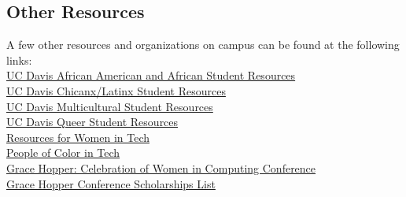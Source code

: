 \documentclass{article}
\begin{document}
\subsection {Other Resources} 
A few other resources and organizations on campus can be found at the following links:  \\

\href{https://www.ucdavis.edu/admissions/undergraduate/community/african-american-student-resources/}{UC Davis African American and African Student Resources}\\

\href{https://www.ucdavis.edu/admissions/undergraduate/community/latino-chicano-organizations/}{UC Davis Chicanx/Latinx Student Resources}\\

\href{https://www.ucdavis.edu/admissions/undergraduate/community/}{UC Davis Multicultural Student Resources}\\

\href{http://lgbtqia.ucdavis.edu/connected/student-org.html}{UC Davis Queer Student Resources}\\

\href{https://github.com/cristianoliveira/awesome4girls}{Resources for Women in Tech} \\

\href{http://peopleofcolorintech.com/}{People of Color in Tech}\\

\href{http://ghc.anitaborg.org/}{Grace Hopper: Celebration of Women in Computing Conference}\\

\href{https://github.com/freialobo/GHC-Scholarships}{Grace Hopper Conference Scholarships List}\\
\newpage
{}
\label{glossary}

\end{document}
